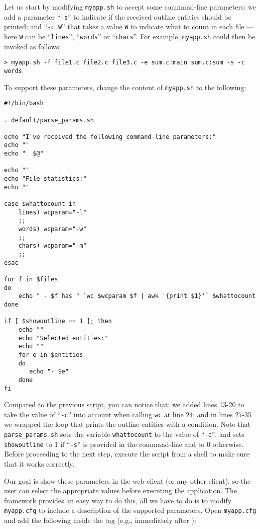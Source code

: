 Let us start by modifying \texttt{myapp.sh} to accept some
command-line parameters: we add a parameter ``\texttt{-s}'' to
indicate if the received outline entities should be printed; and
``\texttt{-c W}'' that takes a value \texttt{W} to indicate what to
count in each file --- here \texttt{W} can be ``\texttt{lines}'',
``\texttt{words}'' or ``\texttt{chars}''.
%
For example, \texttt{myapp.sh} could then be invoked as follows:


\medskip
\begin{lstlisting}
> myapp.sh -f file1.c file2.c file3.c -e sum.c:main sum.c:sum -s -c words
\end{lstlisting}

\medskip
\noindent
To support these parameters, change the content of \texttt{myapp.sh}
to the following:

\medskip
\begin{lstlisting}[style=script]
#!/bin/bash

. default/parse_params.sh

echo "I've received the following command-line parameters:"
echo ""
echo "  $@"

echo ""
echo "File statistics:"
echo ""

case $whattocount in
    lines) wcparam="-l"
    ;;
    words) wcparam="-w"
    ;;
    chars) wcparam="-m"
    ;;
esac

for f in $files 
do
    echo " - $f has " `wc $wcparam $f | awk '{print $1}'` $whattocount
done

if [ $showoutline == 1 ]; then
    echo ""
    echo "Selected entities:"
    echo ""
    for e in $entities 
    do
       echo "- $e"
    done
fi
\end{lstlisting}

\medskip
\noindent
Compared to the previous script, you can notice that: we added lines
13-20 to take the value of ``\texttt{-c}'' into account when calling
\texttt{wc} at line 24; and in lines 27-35 we wrapped the loop that
prints the outline entities with a condition.
%
Note that \texttt{parse\_params.sh} sets the variable
\texttt{whattocount} to the value of ``\texttt{-c}'', and sets
\texttt{showoutline} to 1 if ``\texttt{-s}'' is provided in the
command-line and to 0 otherwise. Before proceeding to the next step,
execute the script from a shell to make sure that it works correctly.

Our goal is show these parameters in the web-client (or any other
client), so the user can select the appropriate values before
executing the application. The \ei framework provides an easy way to
do this, all we have to do is to modify \texttt{myapp.cfg} to include
a description of the supported parameters. Open \texttt{myapp.cfg} and
add the following inside the  tag (e.g., immediately after
):

